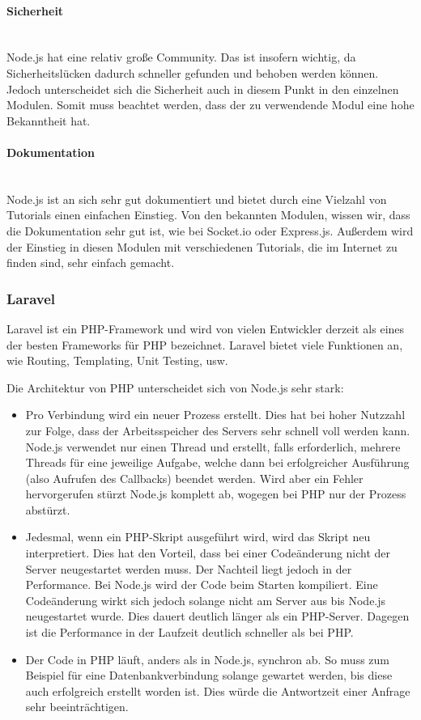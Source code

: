 \paragraph{Sicherheit} \mbox{}\\
Node.js hat eine relativ gro{\ss}e Community. Das ist insofern wichtig, da Sicherheitsl\"ucken dadurch schneller gefunden und behoben werden k\"onnen. Jedoch unterscheidet sich die Sicherheit auch in diesem Punkt in den einzelnen Modulen. Somit muss beachtet werden, dass der zu verwendende Modul eine hohe Bekanntheit hat.

\paragraph{Dokumentation} \mbox{}\\
Node.js ist an sich sehr gut dokumentiert und bietet durch eine Vielzahl von Tutorials einen einfachen Einstieg. Von den bekannten Modulen, wissen wir, dass die Dokumentation sehr gut ist, wie bei Socket.io oder Express.js. Au{\ss}erdem wird der Einstieg in diesen Modulen mit verschiedenen Tutorials, die im Internet zu finden sind, sehr einfach gemacht.

\subsubsection{Laravel}
Laravel ist ein \gls{PHP}-Framework und wird von vielen Entwickler derzeit als eines der besten Frameworks f\"ur \gls{PHP} bezeichnet.
Laravel bietet viele Funktionen an, wie Routing, Templating, Unit Testing, usw.

Die Architektur von \gls{PHP} unterscheidet sich von Node.js sehr stark:\cite{php_eval}
\begin{itemize}
    \item Pro Verbindung wird ein neuer Prozess erstellt. Dies hat bei hoher Nutzzahl zur Folge, dass der Arbeitsspeicher des Servers sehr schnell voll werden kann.
    Node.js verwendet nur einen Thread und erstellt, falls erforderlich, mehrere Threads f\"ur eine jeweilige Aufgabe, welche dann bei erfolgreicher Ausf\"uhrung (also Aufrufen des Callbacks) beendet werden. Wird aber ein Fehler hervorgerufen st\"urzt Node.js komplett ab, wogegen bei \gls{PHP} nur der Prozess abst\"urzt.
    \item Jedesmal, wenn ein \gls{PHP}-Skript ausgef\"uhrt wird, wird das Skript neu interpretiert. Dies hat den Vorteil, dass bei einer Code\"anderung nicht der Server neugestartet werden muss. Der Nachteil liegt jedoch in der Performance.
    Bei Node.js wird der Code beim Starten kompiliert. Eine Code\"anderung wirkt sich jedoch solange nicht am Server aus bis Node.js neugestartet wurde. Dies dauert deutlich l\"anger als ein \gls{PHP}-Server. Dagegen ist die Performance in der Laufzeit deutlich schneller als bei \gls{PHP}.
    \item Der Code in \gls{PHP} l\"auft, anders als in Node.js, synchron ab. So muss zum Beispiel f\"ur eine Datenbankverbindung solange gewartet werden, bis diese auch erfolgreich erstellt worden ist. Dies w\"urde die Antwortzeit einer Anfrage sehr beeintr\"achtigen.
\end{itemize}

